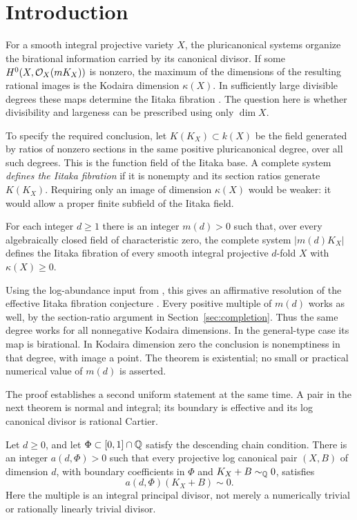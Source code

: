 \section{Introduction}\label{sec:introduction}

For a smooth integral projective variety $X$, the pluricanonical
systems organize the birational information carried by its canonical
divisor. If some $H^0(X,\mathcal O_X(mK_X))$ is nonzero, the maximum of the
dimensions of the resulting rational images is the Kodaira dimension
$\kappa(X)$. In sufficiently large divisible degrees these maps determine
the Iitaka fibration \cite{Iitaka1971}. The question here is whether divisibility and
largeness can be prescribed using only $\dim X$.

To specify the required conclusion, let $K(K_X)\subset k(X)$ be the field
generated by ratios of nonzero sections in the same positive
pluricanonical degree, over all such degrees. This is the function field
of the Iitaka base. A complete system \emph{defines the Iitaka fibration}
if it is nonempty and its section ratios generate $K(K_X)$. Requiring
only an image of dimension $\kappa(X)$ would be weaker: it would allow
a proper finite subfield of the Iitaka field.

\begin{theorem}\label{thm:main}
For each integer $d\geq1$ there is an integer $m(d)>0$ such that, over
every algebraically closed field of characteristic zero, the complete
system $|m(d)K_X|$ defines the Iitaka fibration of every smooth integral
projective $d$-fold $X$ with $\kappa(X)\geq0$.
\end{theorem}

Using the log-abundance input from \cite{LA}, this gives an affirmative
resolution of the effective Iitaka fibration conjecture
\cite[Conjecture~1.1]{BirkarZhang2016}. Every positive multiple of
$m(d)$ works as well, by the section-ratio argument in
Section~\ref{sec:completion}.
Thus the same degree works for all nonnegative Kodaira dimensions. In
the general-type case its map is birational. In Kodaira dimension zero
the conclusion is nonemptiness in that degree, with image a point.
The theorem is existential; no small or practical numerical value of
$m(d)$ is asserted.

The proof establishes a second uniform statement at the same time.
A pair in the next theorem is normal and integral; its boundary is
effective and its log canonical divisor is rational Cartier.

\begin{theorem}\label{thm:lc-index}
Let $d\geq0$, and let $\Phi\subset[0,1]\cap\mathbb Q$ satisfy the descending
chain condition. There is an integer $a(d,\Phi)>0$ such that every
projective log canonical pair $(X,B)$ of dimension $d$, with boundary
coefficients in $\Phi$ and $K_X+B\sim_\mathbb Q0$, satisfies
\[
                         a(d,\Phi)(K_X+B)\sim0.
\]
Here the multiple is an integral principal divisor, not merely a
numerically trivial or rationally linearly trivial divisor.
\end{theorem}

